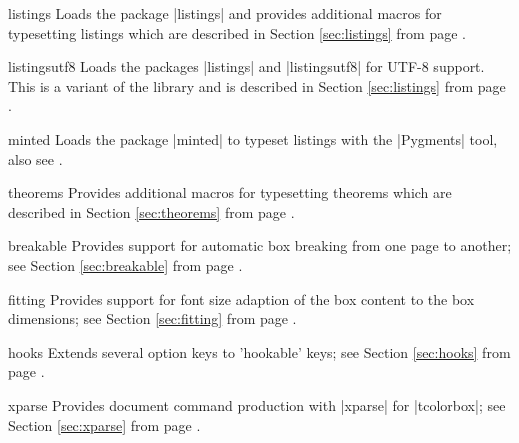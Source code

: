 {\begin{docTcbKey}[library]{listings}{}{}
  Loads the package |listings| \cite{heinz:2013a} and provides additional
  macros for typesetting listings which are described in Section \ref{sec:listings}
  from page \pageref{sec:listings}.
\end{docTcbKey}

\begin{docTcbKey}[library]{listingsutf8}{}{}
  Loads the packages |listings| \cite{heinz:2013a} and
  |listingsutf8| \cite{oberdiek:2011a} for UTF-8 support.
  This is a variant of the library 
  and is described in Section \ref{sec:listings}
  from page \pageref{sec:listings}.
\end{docTcbKey}

\begin{docTcbKey}[library]{minted}{}{}
  Loads the package |minted| \cite{rudolph:2011a} to
  typeset listings with the |Pygments| \cite{pygments:2013} tool,
  also see .
\end{docTcbKey}

\begin{docTcbKey}[library]{theorems}{}{}
  Provides additional
  macros for typesetting theorems which are described in Section \ref{sec:theorems}
  from page \pageref{sec:theorems}.
\end{docTcbKey}


\begin{docTcbKey}[library]{breakable}{}{}
  Provides support for automatic box breaking from one page to another;
  see Section \ref{sec:breakable} from page \pageref{sec:breakable}.
\end{docTcbKey}

\begin{docTcbKey}[library]{fitting}{}{}
  Provides support for font size adaption of the box content to
  the box dimensions;
  see Section \ref{sec:fitting} from page \pageref{sec:fitting}.
\end{docTcbKey}

\begin{docTcbKey}[library]{hooks}{}{}
  Extends several option keys to 'hookable' keys;
  see Section \ref{sec:hooks} from page \pageref{sec:hooks}.
\end{docTcbKey}

\begin{docTcbKey}[library]{xparse}{}{}
  Provides document command production with |xparse| for |tcolorbox|;
  see Section \ref{sec:xparse} from page \pageref{sec:xparse}.
\end{docTcbKey}


}
